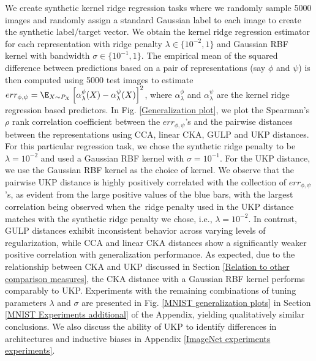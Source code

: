 \documentclass{article} %
\newcommand{\repone}{\phi}
\newcommand{\reptwo}{\psi}
\newcommand{\metricstname}{UKP }
\theoremstyle{plain}
\begin{document}
We create synthetic kernel ridge regression tasks where we randomly sample 5000 images and randomly assign a standard Gaussian label to each image to create the synthetic label/target vector. We obtain the kernel ridge regression estimator for each representation with ridge penalty $\lambda \in \{10^{-2},1\}$ and Gaussian RBF kernel with bandwidth $\sigma \in \{10^{-1}, 1\}$. The empirical mean of the squared difference between predictions based on a pair of representations (say $\repone$ and $\reptwo$) is then computed using 5000 test images to estimate $err_{\repone,\reptwo} = \E_{X \sim P_{X}}\left[\alpha_{\lambda}^{\repone}(X)-\alpha_{\lambda}^{\reptwo}(X)\right]^{2}$, where $\alpha_{\lambda}^{\repone}$ and $\alpha_{\lambda}^{\reptwo}$ are the kernel ridge regression based predictors. 
In Fig. \ref{Generalization plot}, we plot the Spearman's $\rho$ rank correlation coefficient between the $err_{\repone,\reptwo}$'s and the pairwise distances between the representations using CCA, linear CKA, GULP and UKP distances. For this particular regression task, we chose the synthetic ridge penalty to be $\lambda=10^{-2}$ and used a Gaussian RBF kernel with $\sigma=10^{-1}$. For the \metricstname distance, we use the Gaussian RBF kernel as the choice of kernel. We observe that the pairwise \metricstname distance is highly positively correlated with the collection of $err_{\repone,\reptwo}$'s, as evident from the large positive values of the blue bars, with the largest correlation being observed when the ridge penalty used in the \metricstname distance matches with the synthetic ridge penalty we chose, i.e., $\lambda=10^{-2}$. In contrast, GULP distances exhibit inconsistent behavior across varying levels of regularization, while CCA and linear CKA distances show a significantly weaker positive correlation with generalization performance. As expected, due to the relationship between CKA and \metricstname discussed in Section \ref{Relation to other comparison measures}, the CKA distance with a Gaussian RBF kernel performs comparably to UKP. 
Experiments with the remaining combinations of tuning parameters $\lambda$ and $\sigma$ are presented in Fig. \ref{MNIST generalization plots} in Section \ref{MNIST Experiments additional} of the Appendix, yielding qualitatively similar conclusions.
We also discuss the ability of \metricstname to identify differences in architectures and inductive biases in Appendix \ref{ImageNet experiments experiments}.
\end{document}

